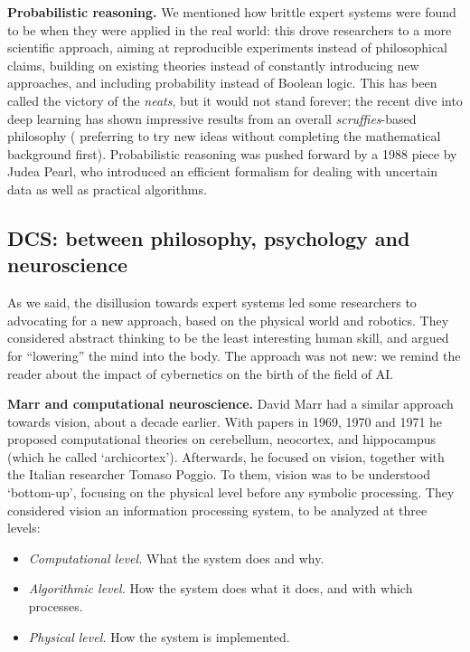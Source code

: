 \documentclass[../main.tex]{subfiles}
\begin{document}
\vspace{4pt}
\textbf{Probabilistic reasoning.}
We mentioned how brittle expert systems were found to be when they were applied in the real world: this drove researchers to a more scientific approach, aiming at reproducible experiments instead of philosophical claims, building on existing theories instead of constantly introducing new approaches, and including probability instead of Boolean logic. This has been called the victory of the \textit{neats}, but it would not stand forever; the recent dive into deep learning has shown impressive results from an overall \textit{scruffies}-based philosophy ( preferring to try new ideas without completing the mathematical background first). Probabilistic reasoning was pushed forward by a 1988 piece by Judea Pearl\cite{pearlProbabilisticReasoningIntelligent1988}, who introduced an efficient formalism for dealing with uncertain data as well as practical algorithms.

\subsection{DCS: between philosophy, psychology and neuroscience}
As we said, the disillusion towards expert systems led some researchers to advocating for a new approach, based on the physical world and robotics. They considered abstract thinking to be the least interesting human skill, and argued for ``lowering'' the mind into the body. The approach was not new: we remind the reader about the impact of cybernetics on the birth of the field of AI.

\vspace{4pt}
\textbf{Marr and computational neuroscience.}
David Marr had a similar approach towards vision, about a decade earlier. With papers in 1969, 1970 and 1971 he proposed computational theories on cerebellum\cite{marrTheoryCerebellarCortex1969}, neocortex\cite{marrTheoryCerebralNeocortex1970}, and hippocampus (which he called `archicortex')\cite{marrSimpleMemoryTheory1971}. Afterwards, he focused on vision, together with the Italian researcher Tomaso Poggio. To them, vision was to be understood `bottom-up', focusing on the physical level before any symbolic processing. They considered vision an information processing system, to be analyzed at three levels\cite{marrUnderstandingComputationUnderstanding1976}:

\begin{itemize}
    \item \textit{Computational level.} What the system does and why.
    \item \textit{Algorithmic level.} How the system does what it does, and with which processes.
    \item \textit{Physical level.} How the system is implemented.
\end{itemize}
\end{document}
